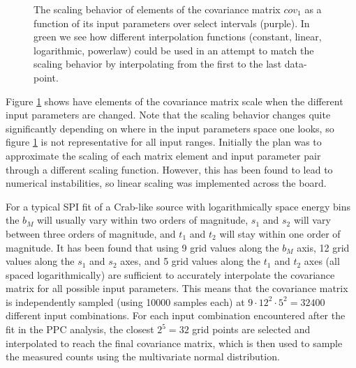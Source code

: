 \documentclass{report}
\begin{document}
\begin{figure}[h]
  \centering
  \caption{The scaling behavior of elements of the covariance matrix $cov_1$ as a function of its input parameters over select intervals (purple). In green we see how different interpolation functions (constant, linear, logarithmic, powerlaw) could be used in an attempt to match the scaling behavior by interpolating from the first to the last data-point. }
  \label{fig ppc scaling}
\end{figure}

Figure \ref{fig ppc scaling} shows have elements of the covariance matrix scale when the different input parameters are changed. Note that the scaling behavior changes quite significantly depending on where in the input parameters space one looks, so figure \ref{fig ppc scaling} is not representative for all input ranges. Initially the plan was to approximate the scaling of each matrix element and input parameter pair through a different scaling function. However, this has been found to lead to numerical instabilities, so linear scaling was implemented across the board.

For a typical SPI fit of a Crab-like source with logarithmically space energy bins the $b_M$ will usually vary within two orders of magnitude, $s_1$ and $s_2$ will vary between three orders of magnitude, and $t_1$ and $t_2$ will stay within one order of magnitude. It has been found that using 9 grid values along the $b_M$ axis, 12 grid values along the $s_1$ and $s_2$ axes, and 5 grid values along the $t_1$ and $t_2$ axes (all spaced logarithmically) are sufficient to accurately interpolate the covariance matrix for all possible input parameters. This means that the covariance matrix is independently sampled (using 10000 samples each) at $9\cdot12^2\cdot5^2=32400$ different input combinations. For each input combination encountered after the fit in the PPC analysis, the closest $2^5=32$ grid points are selected and interpolated to reach the final covariance matrix, which is then used to sample the measured counts using the multivariate normal distribution. 
\end{document}
